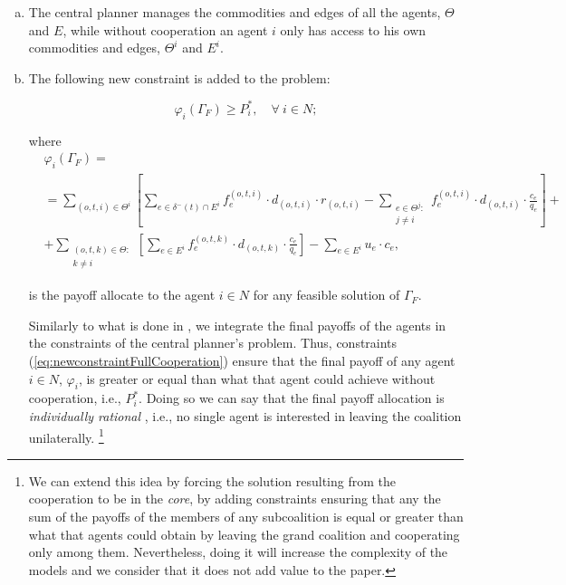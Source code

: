 \documentclass[review]{elsarticle}
\begin{document}
\begin{enumerate}[(a)]
	\item The central planner manages the commodities and edges of
all the agents, $\Theta$ and $E$, while without cooperation an agent $i$ only has access to his own commodities and edges, $\Theta^i$ and $E^i$.
	\item The following new constraint is added to the problem:
	
\begin{equation}\label{eq:newconstraintFullCooperation}
\varphi_i(\Gamma_F) \geq P_i^*,  \quad \forall\ i\in N; 
\end{equation}

where
\begin{equation}
    \begin{split}
    & \varphi_i(\Gamma_F) =\label{eq:FullCooperationPayoff} \\
    & = \sum_{(o,t,i)\in \Theta^i} \left[ \sum_{e \in \delta^-(t)\cap E^i} f_e^{(o,t,i)} \cdot d_{(o,t,i)} \cdot r_{(o,t,i)} -  \sum_{\substack{e\in \Theta^j \colon\\ j\not = i}} f_e^{(o,t,i)} \cdot d_{(o,t,i)} \cdot \frac{c_e}{q_e} \right] + \\
    & + \sum_{\substack{(o,t,k) \in \Theta  \colon \\ k \not = i}} \left[\sum_{e \in E^i} f_e^{(o,t,k)} \cdot d_{(o,t,k)} \cdot \frac{c_e}{q_e}\right] - \sum_{e \in E^i} u_e \cdot c_e, 
    \end{split}
\end{equation}

is the payoff allocate to the agent $i\in N$ for any feasible solution
of $\Gamma_F$.
	
Similarly to what is done in \cite{VANOVERMEIRE2014125}, we integrate the final payoffs of the agents in the constraints of the central planner's problem. Thus, constraints (\ref{eq:newconstraintFullCooperation}) ensure that the final payoff of any agent $i\in N$, $\varphi_i$, is greater or equal than what that agent could achieve without cooperation, i.e., $P_i^*$.  Doing so we can say that the final payoff allocation is \emph{individually rational} \cite{GONZALEZ2010}, i.e., no single agent is interested in leaving the coalition unilaterally.  \footnote{We can extend this idea by forcing the solution resulting from the cooperation to be in the \emph{core}, by adding constraints ensuring that any the sum of the payoffs of the members of any subcoalition is equal or greater than what that agents could obtain by leaving the grand coalition and cooperating only among them. Nevertheless, doing it will increase the complexity of the models and we consider that it does not add value to the paper.}
	


\end{enumerate}
\end{document}
